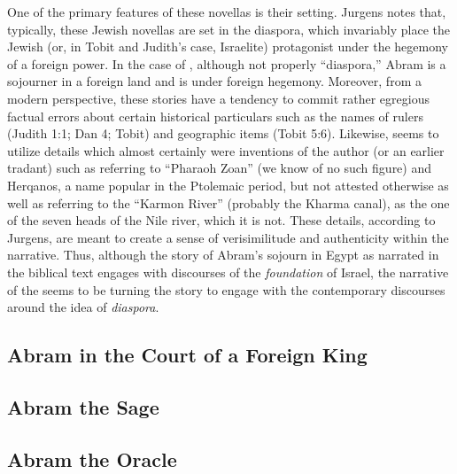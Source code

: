  One of the primary features of these novellas is their setting. Jurgens notes that, typically, these Jewish novellas are set in the diaspora, which invariably place the Jewish (or, in Tobit and Judith's case, Israelite) protagonist under the hegemony of a foreign power. In the case of \ga, although not properly ``diaspora,'' Abram is a sojourner in a foreign land and is under foreign hegemony. Moreover, from a modern perspective, these stories have a tendency to commit rather egregious factual errors about certain historical particulars such as the names of rulers (Judith 1:1; Dan 4; Tobit) and geographic items (Tobit 5:6). Likewise, \ga seems to utilize details which almost certainly were inventions of the author (or an earlier tradant) such as referring to ``Pharaoh Zoan'' (we know of no such figure) and Herqanos, a name popular in the Ptolemaic period, but not attested otherwise as well as referring to the ``Karmon River'' (probably the Kharma canal), as the one of the seven heads of the Nile river, which it is not.\autocites[7]{jurgens_jsj2018}[See also][50--59]{machiela_as2010}[197--199]{fitzmyer2004} These details, according to Jurgens, are meant to create a sense of verisimilitude and authenticity within the narrative. Thus, although the story of Abram's sojourn in Egypt as narrated in the biblical text engages with discourses of the \emph{foundation} of Israel, the narrative of the \ga seems to be turning the story to engage with the contemporary discourses around the idea of \emph{diaspora}.

 \subsection{Abram in the Court of a Foreign King}
 \subsection{Abram the Sage}
 \subsection{Abram the Oracle}